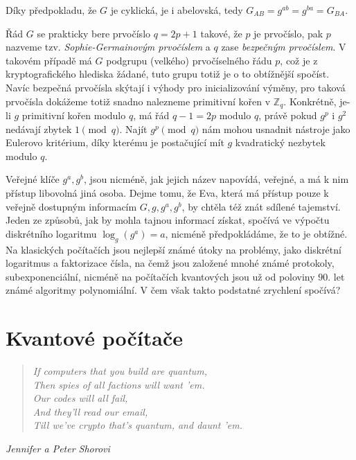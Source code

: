 \documentclass[12pt]{report}
\begin{document}
Díky předpokladu, že $G$ je cyklická, je i abelovská, tedy $G_{AB} = g^{ab} = g^{ba} = G_{BA}$.
\begin{figure}[h]
\begin{center} 
\end{center}
\end{figure}

Řád $G$ se prakticky bere prvočíslo $q = 2p+1$ takové, že $p$ je prvočíslo, pak $p$ nazveme tzv. \textit{Sophie-Germainovým prvočíslem} a $q$ zase \textit{bezpečným prvočíslem}. V takovém případě má $G$ podgrupu (velkého) prvočíselného řádu $p$, což je z kryptografického hlediska žádané, tuto grupu totiž je o to obtížnější spočíst. Navíc bezpečná prvočísla skýtají i výhody pro inicializování výměny, pro taková prvočísla dokážeme totiž snadno nalezneme primitivní kořen v $\mathbb{Z}_q$. Konkrétně, je-li $g$ primitivní kořen modulo $q$, má řád $q-1 = 2p$ modulo $q$, právě pokud $g^{p}$ i $g^2$ nedávají zbytek $1 \pmod{q}$. Najít $g^{p} \pmod{q}$ nám mohou usnadnit nástroje jako Eulerovo kritérium, díky kterému je postačující mít $g$ kvadratický nezbytek modulo $q$.

Veřejné klíče $g^a,g^b$, jsou nicméně, jak jejich název napovídá, veřejné, a má k nim přístup libovolná jiná osoba. Dejme tomu, že Eva, která má přístup pouze k veřejně dostupným informacím $G,g,g^a,g^b$, by chtěla též znát sdílené tajemství. Jeden ze způsobů, jak by mohla tajnou informací získat, spočívá ve výpočtu diskrétního logaritmu $\log_g(g^a) = a$, nicméně předpokládáme, že to je obtížné. Na klasických počítačích jsou nejlepší známé útoky na problémy, jako diskrétní logaritmus a faktorizace čísla, na čemž jsou založené mnohé známé protokoly, subexponenciální, nicméně na počítačích kvantových jsou už od poloviny $90$. let známé algoritmy polynomiální. V čem však takto podstatné zrychlení spočívá?


\section{Kvantové počítače}

\begin{center}
\begin{verse}
\qquad \textit{If computers that you build are quantum,}\\
\qquad \textit{Then spies of all factions will want 'em.}\\
\qquad \textit{Our codes will all fail,}\\
\qquad \textit{And they'll read our email,}\\
\qquad \textit{Till we've crypto that's quantum, and daunt 'em. }
\end{verse}
\hfill \textit{Jennifer a Peter Shorovi}
\end{center}
\end{document}
